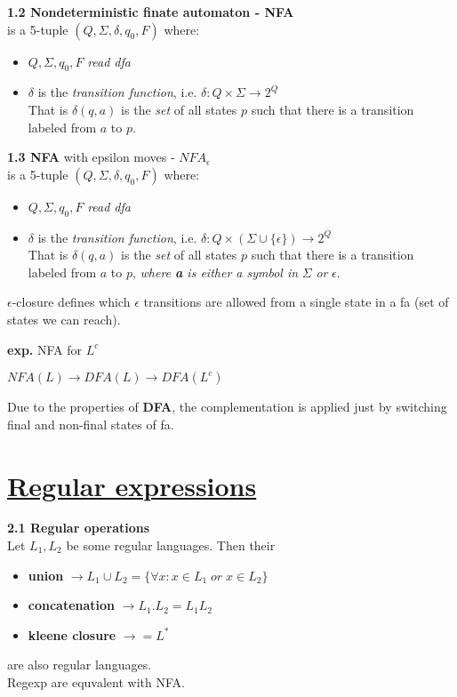 \documentclass{article}
\begin{document}
\begin{multicols}{2}
\textbf{1.2 Nondeterministic finate automaton - NFA}\\
is a 5-tuple $(Q, \Sigma, \delta, q_0, F)$ where:
\begin{itemize}
    \setlength\itemsep{-0.4em}
    \item $Q, \Sigma, q_0, F$ \textit{read dfa}
    \item $\delta$ is the \textit{transition function}, i.e. $\delta: Q \times \Sigma \rightarrow 2^Q$ \\
        That is $\delta(q, a)$ is the \textit{set} of all states $p$ such that there is a transition labeled from $a$ to $p$.
\end{itemize}

\textbf{1.3 NFA} with epsilon moves - $NFA_{\epsilon}$\\
is a 5-tuple $(Q, \Sigma, \delta, q_0, F)$ where:
\begin{itemize}
    \setlength\itemsep{-0.4em}
    \item $Q, \Sigma, q_0, F$ \textit{read dfa}
    \item $\delta$ is the \textit{transition function}, i.e. $\delta: Q \times (\Sigma \cup \{\epsilon\} )\rightarrow 2^Q$ \\
    That is $\delta(q, a)$ is the \textit{set} of all states $p$ such that there is a transition labeled from $a$ to $p$, \textit{where \textbf{a} is either a symbol in} $\Sigma$  \textit{or} $\epsilon$.
\end{itemize}
$\epsilon$-closure defines which $\epsilon$ transitions are allowed from a single state in a fa (set of states we can reach).

\textbf{exp.} NFA for $L^{c}$\\
\begin{center}
    \begin{math}
        NFA(L) \rightarrow DFA(L) \rightarrow DFA(L^{c})
    \end{math}
\end{center}
Due to the properties of \textbf{DFA}, the complementation is applied just by switching final and non-final states of fa.

\section{\underline{Regular expressions}}


\textbf{2.1 Regular operations}\\
Let $L_1, L_2$ be some regular languages. Then their
\begin{itemize}
    \setlength\itemsep{-0.4em}
    \item \textbf{union} $\rightarrow L_1 \cup L_2 = \{\forall x : x \in L_1\; or\; x \in L_2 \} $
    \item \textbf{concatenation} $\rightarrow L_1 . L_2 = L_1L_2$
    \item \textbf{kleene closure} $\rightarrow = L^*$
\end{itemize}
are also regular languages.\\
Regexp are equvalent with NFA.


\end{multicols}
\end{document}
